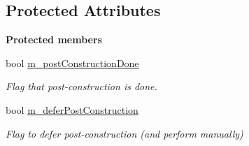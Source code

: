 \subsection*{Protected Attributes}
\begin{Indent}\textbf{ Protected members}\par
\begin{DoxyCompactItemize}
\item 
\mbox{\label{classrev_1_1_abstract_service_af069c97e599e0261ad8d4db9f7afc4cb}} 
bool \mbox{\hyperlink{classrev_1_1_abstract_service_af069c97e599e0261ad8d4db9f7afc4cb}{m\+\_\+post\+Construction\+Done}}
\begin{DoxyCompactList}\small\item\em Flag that post-\/construction is done. \end{DoxyCompactList}\item 
\mbox{\label{classrev_1_1_abstract_service_a27d22c230f387fd5fe04b394ec430348}} 
bool \mbox{\hyperlink{classrev_1_1_abstract_service_a27d22c230f387fd5fe04b394ec430348}{m\+\_\+defer\+Post\+Construction}}
\begin{DoxyCompactList}\small\item\em Flag to defer post-\/construction (and perform manually) \end{DoxyCompactList}\end{DoxyCompactItemize}
\end{Indent}
